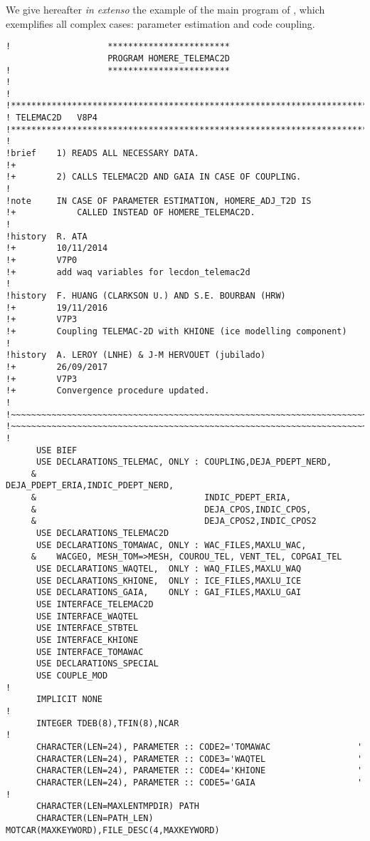 We give hereafter \textit{in extenso} the example of the main program of
, which exemplifies all complex cases: parameter estimation and
code coupling.
\begin{lstlisting}[language=TelFortran]
!                   ************************
                    PROGRAM HOMERE_TELEMAC2D
!                   ************************
!
!
!***********************************************************************
! TELEMAC2D   V8P4
!***********************************************************************
!
!brief    1) READS ALL NECESSARY DATA.
!+
!+        2) CALLS TELEMAC2D AND GAIA IN CASE OF COUPLING.
!
!note     IN CASE OF PARAMETER ESTIMATION, HOMERE_ADJ_T2D IS
!+            CALLED INSTEAD OF HOMERE_TELEMAC2D.
!
!history  R. ATA
!+        10/11/2014
!+        V7P0
!+        add waq variables for lecdon_telemac2d
!
!history  F. HUANG (CLARKSON U.) AND S.E. BOURBAN (HRW)
!+        19/11/2016
!+        V7P3
!+        Coupling TELEMAC-2D with KHIONE (ice modelling component)
!
!history  A. LEROY (LNHE) & J-M HERVOUET (jubilado)
!+        26/09/2017
!+        V7P3
!+        Convergence procedure updated.
!
!~~~~~~~~~~~~~~~~~~~~~~~~~~~~~~~~~~~~~~~~~~~~~~~~~~~~~~~~~~~~~~~~~~~~~~~
!~~~~~~~~~~~~~~~~~~~~~~~~~~~~~~~~~~~~~~~~~~~~~~~~~~~~~~~~~~~~~~~~~~~~~~~
!
      USE BIEF
      USE DECLARATIONS_TELEMAC, ONLY : COUPLING,DEJA_PDEPT_NERD,
     &                                 DEJA_PDEPT_ERIA,INDIC_PDEPT_NERD,
     &                                 INDIC_PDEPT_ERIA,
     &                                 DEJA_CPOS,INDIC_CPOS,
     &                                 DEJA_CPOS2,INDIC_CPOS2
      USE DECLARATIONS_TELEMAC2D
      USE DECLARATIONS_TOMAWAC, ONLY : WAC_FILES,MAXLU_WAC,
     &    WACGEO, MESH_TOM=>MESH, COUROU_TEL, VENT_TEL, COPGAI_TEL
      USE DECLARATIONS_WAQTEL,  ONLY : WAQ_FILES,MAXLU_WAQ
      USE DECLARATIONS_KHIONE,  ONLY : ICE_FILES,MAXLU_ICE
      USE DECLARATIONS_GAIA,    ONLY : GAI_FILES,MAXLU_GAI
      USE INTERFACE_TELEMAC2D
      USE INTERFACE_WAQTEL
      USE INTERFACE_STBTEL
      USE INTERFACE_KHIONE
      USE INTERFACE_TOMAWAC
      USE DECLARATIONS_SPECIAL
      USE COUPLE_MOD
!
      IMPLICIT NONE
!
      INTEGER TDEB(8),TFIN(8),NCAR
!
      CHARACTER(LEN=24), PARAMETER :: CODE2='TOMAWAC                 '
      CHARACTER(LEN=24), PARAMETER :: CODE3='WAQTEL                  '
      CHARACTER(LEN=24), PARAMETER :: CODE4='KHIONE                  '
      CHARACTER(LEN=24), PARAMETER :: CODE5='GAIA                    '
!
      CHARACTER(LEN=MAXLENTMPDIR) PATH
      CHARACTER(LEN=PATH_LEN) MOTCAR(MAXKEYWORD),FILE_DESC(4,MAXKEYWORD)

\end{lstlisting}
